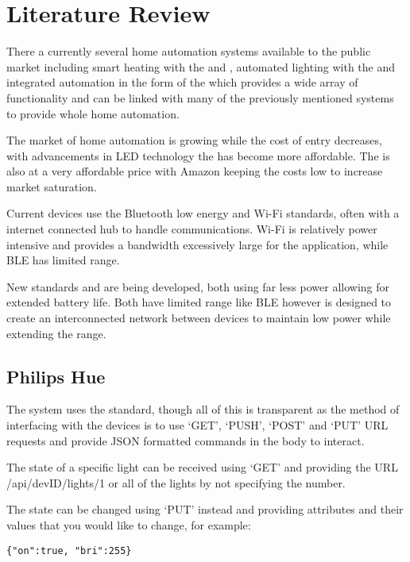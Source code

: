 \section{Literature Review}\label{literature-review}

There a currently several home automation systems available to the
public market including smart heating with the \cite{hive} and
\cite{nest}, automated lighting with the \cite{philipshue} and
integrated automation in the form of the \cite{echo} which provides a
wide array of functionality and can be linked with many of the
previously mentioned systems to provide whole home automation.

The market of home automation is growing while the cost of entry
decreases, with advancements in LED technology the \cite{philipshue} has
become more affordable. The \cite{echo} is also at a very affordable
price with Amazon keeping the costs low to increase market saturation.

Current devices use the Bluetooth low energy and Wi-Fi standards, often
with a internet connected hub to handle communications. Wi-Fi is
relatively power intensive and provides a bandwidth excessively large
for the application, while BLE has limited range.

New standards \cite{zwave} and \cite{zigbee} are being developed, both
using far less power allowing for extended battery life. Both have
limited range like BLE however \cite{zwave} is designed to create an
interconnected network between devices to maintain low power while
extending the range.

\subsection{Philips Hue}\label{philips-hue}

The \cite{philipshue} system uses the \cite{zigbee} standard, though all
of this is transparent as the method of interfacing with the devices is
to use `GET', `PUSH', `POST' and `PUT' URL requests and provide JSON
formatted commands in the body to interact.

The state of a specific light can be received using `GET' and providing
the URL /api/devID/lights/1 or all of the lights by not specifying the
number.

The state can be changed using `PUT' instead and providing attributes
and their values that you would like to change, for example:

\begin{lstlisting}
{"on":true, "bri":255} 
\end{lstlisting}

